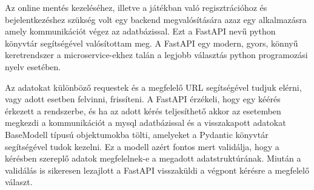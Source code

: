 Az online mentés kezeléséhez, illetve a játékban való regisztrációhoz és bejelentkezéshez szükség volt egy backend megvalósítására azaz egy alkalmazásra amely kommunikációt végez az adatbázissal. Ezt a FastAPI nevű python könyvtár segítségével valósítottam meg. A FastAPI egy modern, gyors, könnyű keretrendszer a microservice-ekhez talán a legjobb választás python programozási nyelv esetében.

Az adatokat különböző requestek és a megfelelő URL segítségével tudjuk elérni, vagy adott esetben felvinni, frissíteni. A FastAPI érzékeli, hogy egy kéérés érkezett a rendszerbe, és ha az adott kérés teljesíthető akkor az esetemben megkezdi a kommunikációt a mysql adatbázissal és a visszakapott adatokat BaseModell típusú objektumokba tölti, amelyeket a Pydantic könyvtár segítségével tudok kezelni. Ez a modell azért fontos mert validálja, hogy a kérésben szereplő adatok megfelelnek-e a megadott adatstruktúrának. Miután a validálás is sikeresen lezajlott a FastAPI visszaküldi a végpont kérésre a megfelelő választ.

